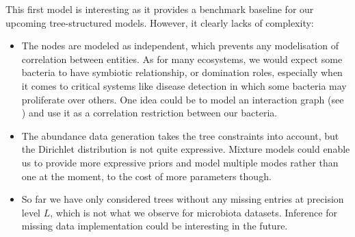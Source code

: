 This first model is interesting as it provides a benchmark baseline for our upcoming tree-structured models.
However, it clearly lacks of complexity:
\begin{itemize}
    \item The nodes are modeled as independent, which prevents any modelisation of correlation between entities.
          As for many ecosystems, we would expect some bacteria to have symbiotic relationship, or domination roles,
          especially when it comes to critical systems like disease detection in which some bacteria may proliferate over others.
          One idea could be to model an interaction graph (see \cite{momal_tree}) and use it as a correlation restriction between our bacteria.
    \item The abundance data generation takes the tree constraints into account, but the Dirichlet distribution is not quite expressive.
          Mixture models could enable us to provide more expressive priors and model multiple modes rather than one at the moment, to the cost of more parameters though.
    \item So far we have only considered trees without any missing entries at precision level $L$, which is not what we observe for microbiota datasets.
          Inference for missing data implementation could be interesting in the future.
\end{itemize}
